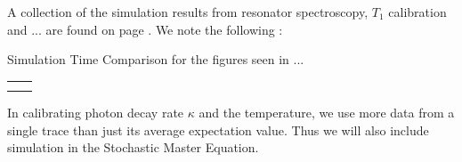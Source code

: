 A collection of the simulation results from resonator spectroscopy, $T_1$ calibration and ... are found on page \pageref{fig:big_figure_test}. We note the following :

\begin{margintable}
    \centering
    \caption{Simulation Time Comparison for the figures seen in  ... }
    \begin{tabular}{c|c}
         &  \\
         & 
    \end{tabular}
    \label{tab:my_label}
\end{margintable}

In calibrating photon decay rate $\kappa$ and the temperature, we use more data from a single trace than just its average expectation value. Thus we will also include simulation in the Stochastic Master Equation.   



